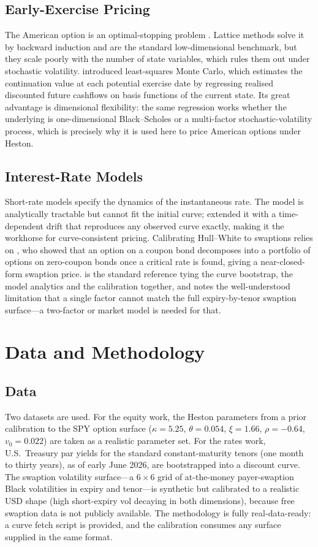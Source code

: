 \documentclass[11pt,a4paper]{report}
\begin{document}
\section{Early-Exercise Pricing}
The American option is an optimal-stopping problem \citep{bensoussan1984}. Lattice
methods \citep{crr1979} solve it by backward induction and are the standard
low-dimensional benchmark, but they scale poorly with the number of state variables,
which rules them out under stochastic volatility. \citet{longstaff2001} introduced
least-squares Monte Carlo, which estimates the continuation value at each potential
exercise date by regressing realised discounted future cashflows on basis functions
of the current state. Its great advantage is dimensional flexibility: the same
regression works whether the underlying is one-dimensional Black--Scholes or a
multi-factor stochastic-volatility process, which is precisely why it is used here to
price American options under Heston.

\section{Interest-Rate Models}
Short-rate models specify the dynamics of the instantaneous rate. The
\citet{vasicek1977} model is analytically tractable but cannot fit the initial
curve; \citet{hullwhite1990} extended it with a time-dependent drift that reproduces
any observed curve exactly, making it the workhorse for curve-consistent pricing.
Calibrating Hull--White to swaptions relies on \citet{jamshidian1989}, who showed
that an option on a coupon bond decomposes into a portfolio of options on
zero-coupon bonds once a critical rate is found, giving a near-closed-form swaption
price. \citet{brigomercurio2006} is the standard reference tying the curve
bootstrap, the model analytics and the calibration together, and notes the
well-understood limitation that a single factor cannot match the full
expiry-by-tenor swaption surface---a two-factor or market model is needed for that.

\chapter{Data and Methodology}

\section{Data}
Two datasets are used. For the equity work, the Heston parameters from a prior
calibration to the SPY option surface ($\kappa=5.25$, $\theta=0.054$, $\xi=1.66$,
$\rho=-0.64$, $v_0=0.022$) are taken as a realistic parameter set. For the rates
work, U.S.\ Treasury par yields for the standard constant-maturity tenors (one month
to thirty years), as of early June 2026, are bootstrapped into a discount curve. The
swaption volatility surface---a $6\times6$ grid of at-the-money payer-swaption Black
volatilities in expiry and tenor---is synthetic but calibrated to a realistic USD
shape (high short-expiry vol decaying in both dimensions), because free swaption data
is not publicly available. The methodology is fully real-data-ready: a curve fetch
script is provided, and the calibration consumes any surface supplied in the same
format.
\end{document}
